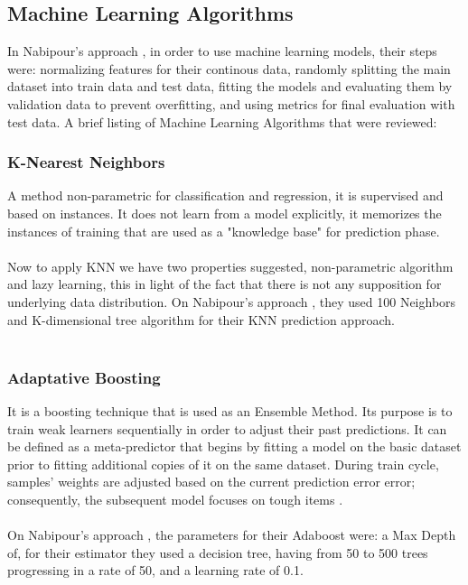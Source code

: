 \documentclass[conference]{IEEEtran}
\begin{document}
\subsection{Machine Learning Algorithms}
In Nabipour's approach \cite{nabipour2020predicting}, in order to use machine learning models, their steps were:  normalizing features for their continous data, randomly splitting the main dataset into train data
and test data, fitting the models and evaluating them by validation data to prevent overfitting, and using metrics for final evaluation with test data.
A brief listing of Machine Learning Algorithms that were reviewed:
\subsubsection{K-Nearest Neighbors}
A method non-parametric for classification and regression, it is supervised and based on instances. It does not learn from a model explicitly, it memorizes
the instances of training that are used as a "knowledge base" for prediction phase.
\\\\
Now to apply KNN we have two properties suggested, non-parametric algorithm and lazy learning, this in light of the fact that there is not any supposition for underlying data distribution.
On Nabipour's approach \cite{nabipour2020predicting}, they used 100 Neighbors and K-dimensional tree algorithm for their KNN prediction approach.
\\\\
\subsubsection{Adaptative Boosting}
It is a boosting technique that is used as an Ensemble Method. Its purpose is to train weak learners sequentially in order to adjust their past predictions. It can be defined as a 
meta-predictor that begins by fitting a model on the basic dataset prior to fitting additional copies of it on the same dataset. During train cycle, samples' weights are adjusted based on the current 
prediction error error; consequently, the subsequent model focuses on tough items \cite{nabipour2020predicting}.
\\\\
On Nabipour's approach \cite{nabipour2020predicting}, the parameters for their Adaboost were: a Max Depth of, for their estimator they used a decision tree, having from 50 to 500 trees progressing in a rate of 50, and a learning rate of 0.1.
\\\\
\end{document}
